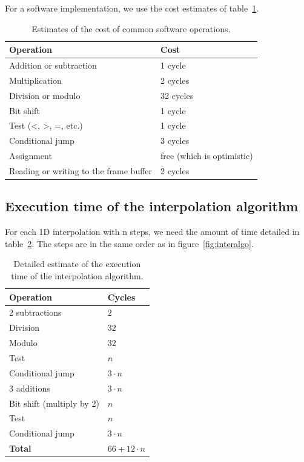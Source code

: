 \documentclass[a4paper,11pt]{kthesis}
\begin{document}
For a software implementation, we use the cost estimates of table~\ref{tab:swcost}.

\begin{table}
\centering
\begin{tabular}{|l|l|}
\hline
\textbf{Operation} & \textbf{Cost} \\
\hline
Addition or subtraction & 1 cycle \\
\hline
Multiplication & 2 cycles \\
\hline
Division or modulo & 32 cycles \\
\hline
Bit shift & 1 cycle \\
\hline
Test (<, >, =, etc.) & 1 cycle \\
\hline
Conditional jump & 3 cycles \\
\hline
Assignment & free (which is optimistic) \\
\hline
Reading or writing to the frame buffer & 2 cycles \\
\hline
\end{tabular}
\caption{Estimates of the cost of common software operations.}\label{tab:swcost}
\end{table}

\subsection{Execution time of the interpolation algorithm}
For each 1D interpolation with n steps, we need the amount of time detailed in table~\ref{tab:intertime}. The steps are in the same order as in figure~\ref{fig:interalgo}.

\begin{table}
\centering
\begin{tabular}{|l|l|}
\hline
\textbf{Operation} & \textbf{Cycles} \\
\hline
2 subtractions & $2$ \\
\hline
Division & $32$ \\
\hline
Modulo & $32$ \\
\hline
Test & $n$ \\
\hline
Conditional jump & $3 \cdot n$ \\
\hline
3 additions & $3 \cdot n$ \\
\hline
Bit shift (multiply by 2) & $n$ \\
\hline
Test & $n$ \\
\hline
Conditional jump & $3 \cdot n$ \\
\hline
\textbf{Total} & $66 + 12 \cdot n$ \\
\hline
\end{tabular}
\caption{Detailed estimate of the execution time of the interpolation algorithm.}\label{tab:intertime}
\end{table}
\end{document}
